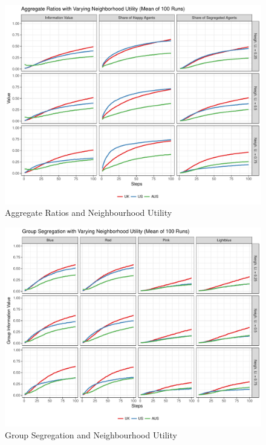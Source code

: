 \documentclass[12pt, a4paper]{article}
\begin{document}
	\begin{figure}[bp!]
		\centering
		\caption{Aggregate Ratios and Neighbourhood Utility}
		\includegraphics[scale=0.6]{./Plots/nb_agg_ratios.pdf}
	\end{figure}
	
	\begin{figure}[bp!]
		\centering
		\caption{Group Segregation and Neighbourhood Utility}
		\includegraphics[scale=0.6]{./Plots/nb_grp_ratios.pdf}
	\end{figure}
	
\end{document}
